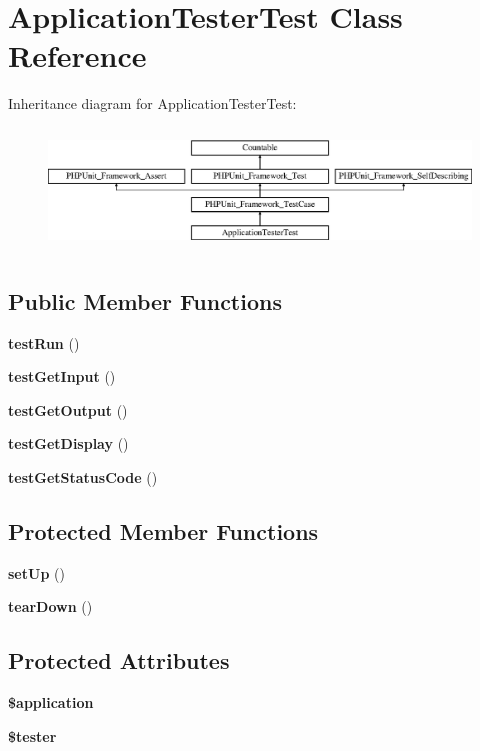 \section{Application\+Tester\+Test Class Reference}
\label{class_symfony_1_1_component_1_1_console_1_1_tests_1_1_tester_1_1_application_tester_test}
Inheritance diagram for Application\+Tester\+Test\+:\begin{figure}[H]
\begin{center}
\leavevmode
\includegraphics[height=3.303835cm]{class_symfony_1_1_component_1_1_console_1_1_tests_1_1_tester_1_1_application_tester_test}
\end{center}
\end{figure}
\subsection*{Public Member Functions}
\begin{DoxyCompactItemize}
\item 
{\bf test\+Run} ()
\item 
{\bf test\+Get\+Input} ()
\item 
{\bf test\+Get\+Output} ()
\item 
{\bf test\+Get\+Display} ()
\item 
{\bf test\+Get\+Status\+Code} ()
\end{DoxyCompactItemize}
\subsection*{Protected Member Functions}
\begin{DoxyCompactItemize}
\item 
{\bf set\+Up} ()
\item 
{\bf tear\+Down} ()
\end{DoxyCompactItemize}
\subsection*{Protected Attributes}
\begin{DoxyCompactItemize}
\item 
{\bf \$application}
\item 
{\bf \$tester}
\end{DoxyCompactItemize}
